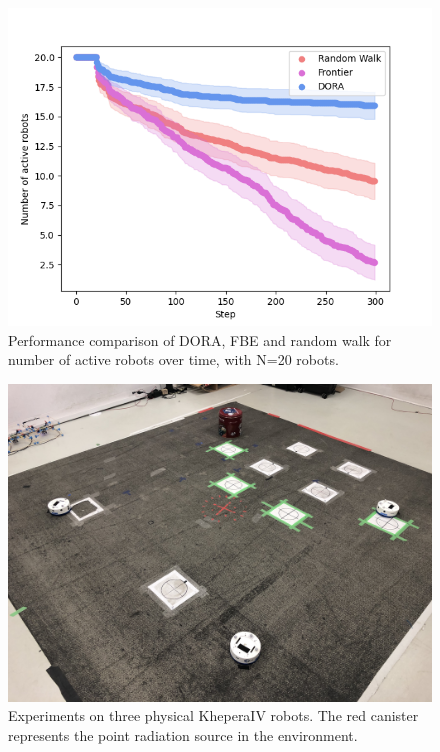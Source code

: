 \begin{figure}[h]
	\centering
    \includegraphics[width=0.99\columnwidth]{images/activerobots_20.png}
    \caption{Performance comparison of DORA, FBE and random walk for number of active robots over time, with N=20 robots.}
    \label{results:failures20}
\end{figure}

\label{annexe: physical}
\begin{figure}[h]
    \centering
    \captionsetup{belowskip=-20pt}
    \includegraphics[width=0.99\columnwidth]{images/arena.jpeg}
    \caption{Experiments on three physical KheperaIV robots. The red canister represents the point radiation source in the environment.}
    \label{arena}
\end{figure}